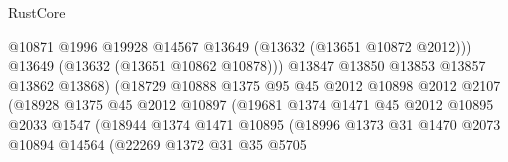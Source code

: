 \begin{lexlean}{RustCore}
\begin{coremodule}
                                            @10871
                                            @1996
                                            @19928
                                            @14567
                                            @13649
                                            (@13632 (@13651 @10872 @2012)))
                                          @13649
                                          (@13632 (@13651 @10862 @10878)))
                                        @13847
                                        @13850
                                        @13853
                                        @13857
                                        @13862
                                        @13868)
                                      (@18729
                                        @10888
                                        @1375
                                        @95
                                        @45
                                        @2012
                                        @10898
                                        @2012
                                        @2107
                                        (@18928
                                          @1375
                                          @45
                                          @2012
                                          @10897
                                          (@19681
                                            @1374
                                            @1471
                                            @45
                                            @2012
                                            @10895
                                            @2033
                                            @1547
                                            (@18944
                                              @1374
                                              @1471
                                              @10895
                                              (@18996
                                                @1373
                                                @31
                                                @1470
                                                @2073
                                                @10894
                                                @14564
                                                (@22269
                                                  @1372
                                                  @31
                                                  @35
                                                  @5705

\end{coremodule}
\end{lexlean}
